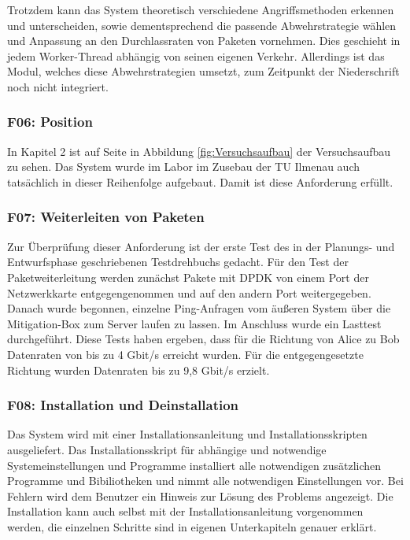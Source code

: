 \documentclass[../review_3.tex]{subfiles}
\begin{document}
Trotzdem kann das System theoretisch verschiedene Angriffsmethoden erkennen und unterscheiden, sowie dementsprechend die passende Abwehrstrategie wählen und Anpassung an den Durchlassraten von Paketen vornehmen. Dies geschieht in jedem Worker-Thread abhängig von seinen eigenen Verkehr.
Allerdings ist das Modul, welches diese Abwehrstrategien umsetzt, zum Zeitpunkt der Niederschrift noch nicht integriert.

\subsubsection{F06: Position}
In Kapitel 2 ist auf Seite \pageref{fig:Versuchsaufbau} in Abbildung \ref{fig:Versuchsaufbau} der Versuchsaufbau zu sehen. Das System wurde im Labor im Zusebau der TU Ilmenau auch tatsächlich in dieser Reihenfolge aufgebaut. Damit ist diese Anforderung erfüllt.

\subsubsection{F07: Weiterleiten von Paketen}
Zur Überprüfung dieser Anforderung ist der erste Test des in der Planungs- und Entwurfsphase geschriebenen Testdrehbuchs gedacht. Für den Test der Paketweiterleitung werden zunächst Pakete mit DPDK von einem Port der Netzwerkkarte entgegengenommen und auf den andern Port weitergegeben. Danach wurde begonnen, einzelne Ping-Anfragen vom äußeren System über die Mitigation-Box zum Server laufen zu lassen. Im Anschluss wurde ein Lasttest durchgeführt. Diese Tests haben ergeben, dass für die Richtung von Alice zu Bob Datenraten von bis zu 4 Gbit/s erreicht wurden. Für die entgegengesetzte Richtung wurden Datenraten bis zu 9,8 Gbit/s erzielt. 

\subsubsection{F08: Installation und Deinstallation}
Das System wird mit einer Installationsanleitung und Installationsskripten ausgeliefert. Das Installationsskript für abhängige und notwendige Systemeinstellungen und Programme installiert alle notwendigen zusätzlichen Programme und Bibiliotheken und nimmt alle notwendigen Einstellungen vor. Bei Fehlern wird dem Benutzer ein Hinweis zur Lösung des Problems angezeigt. Die Installation kann auch selbst mit der Installationsanleitung vorgenommen werden, die einzelnen Schritte sind in eigenen Unterkapiteln genauer erklärt.
\end{document}
